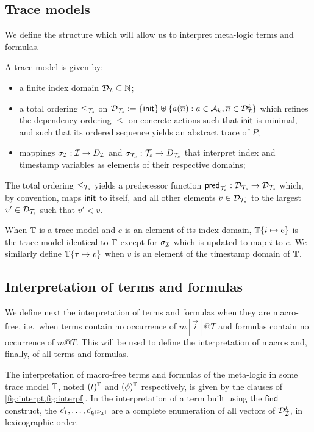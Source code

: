 \subsection{Trace models}

We define the structure which will allow us to interpret meta-logic
terms and formulas.

\begin{definition}
  A trace model is given by:
  \begin{itemize}
    \item a finite index domain $\mathcal{D}_{\mathcal{I}} \subseteq \mathbb{N}$;
    \item a total ordering $\leq_{\mathcal{T}_s}$ on
      $\mathcal{D}_{\mathcal{T}_s} := \{ \mathsf{init} \} \uplus \{ a(\overline{n}) : a\in\mathcal{A}_k, \overline{n}\in\mathcal{D}_{\mathcal{I}}^k
      \}$ which refines the dependency ordering $\leq$ on concrete actions such
      that $\mathsf{init}$ is minimal, and such that its ordered sequence yields an
      abstract trace of $P$;
    \item mappings $\sigma_{\mathcal{I}} : \mathcal{I} \to D_{\mathcal{I}}$
      and $\sigma_{\mathcal{T}_s} : {\mathcal{T}_s} \to D_{\mathcal{T}_s}$ that interpret index and
      timestamp variables as elements of their respective domains;
  \end{itemize}
\end{definition}

The total ordering $\leq_{\mathcal{T}_s}$ yields a predecessor function
$\mathsf{pred}_{\mathcal{T}_s} : \mathcal{D}_{\mathcal{T}_s}\to\mathcal{D}_{\mathcal{T}_s}$ which,
by convention, maps $\mathsf{init}$ to itself,
and all other elements $v \in \mathcal{D}_{\mathcal{T}_s}$ to the largest $v' \in \mathcal{D}_{\mathcal{T}_s}$ such that
$v' < v$.

When $\mathbb{T}$ is a trace model and $e$ is an element of its index domain,
$\mathbb{T}\{i\mapsto e\}$ is the trace model identical to $\mathbb{T}$ except for
$\sigma_{\mathcal{I}}$ which is updated to map $i$ to $e$. We similarly define
$\mathbb{T}\{\tau\mapsto v\}$ when $v$ is an element of the timestamp domain of $\mathbb{T}$.

\subsection{Interpretation of terms and formulas}

\newcommand{\interp}[1]{(#1)}

We define next the interpretation of terms and formulas when they are
macro-free, i.e.\ when terms contain no occurrence of $m[\vec{i}]@T$
and formulas contain no occurrence of $m@T$. This will be used to
define the interpretation of macros and, finally, of all terms
and formulas.

\begin{definition}
  The interpretation of macro-free terms and formulas of the meta-logic in
  some trace model $\mathbb{T}$, noted $\interp{t}^\TM$ and $\interp{\phi}^\TM$
  respectively, is given by the clauses of \cref{fig:interpt,fig:interpf}.
  In the interpretation of a term built using the $\mathsf{find}$
  construct, the $\vec{e}_1, \ldots, \vec{e}_{k^{|\mathcal{D}_{\mathcal{I}}|}}$ are a complete
  enumeration of all vectors of $\mathcal{D}_{\mathcal{I}}^k$, in lexicographic order.
\end{definition}

